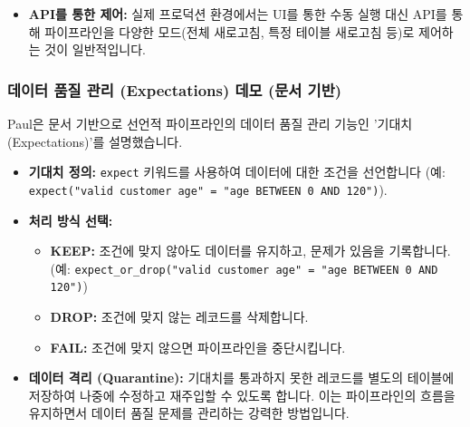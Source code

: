 \documentclass[11pt,a4paper]{article}
\begin{document}
\begin{enumerate}
\begin{itemize}
\begin{itemize}
        \item \textbf{선택적 테이블 새로고침:} 파이프라인 내의 특정 테이블만 선택하여 새로고침할 수 있습니다.
        \item \textbf{이벤트 로그 (Event Log):} 파이프라인의 모든 작업(시작, 리소스 대기, 초기화, 테이블 생성, 실행 등)이 기록되어 문제 발생 시 디버깅에 활용됩니다. 이 로그는 Delta 테이블에 저장되어 완전한 가시성을 제공합니다.
        \item \textbf{쿼리 기록 (Query History):} 엔진이 자동으로 생성하고 실행한 SQL 쿼리 및 실행 계획을 확인할 수 있습니다. 이를 통해 성능 분석 및 최적화에 필요한 정보를 얻을 수 있습니다.
    \end{itemize}
    \item \textbf{API를 통한 제어:} 실제 프로덕션 환경에서는 UI를 통한 수동 실행 대신 API를 통해 파이프라인을 다양한 모드(전체 새로고침, 특정 테이블 새로고침 등)로 제어하는 것이 일반적입니다.
\end{itemize}

\subsubsection{데이터 품질 관리 (Expectations) 데모 (문서 기반)}
Paul은 문서 기반으로 선언적 파이프라인의 데이터 품질 관리 기능인 '기대치(Expectations)'를 설명했습니다.

\begin{itemize}
    \item \textbf{기대치 정의:} \texttt{expect} 키워드를 사용하여 데이터에 대한 조건을 선언합니다 (예: \texttt{expect("valid customer age" = "age BETWEEN 0 AND 120")}).
    \item \textbf{처리 방식 선택:}
    \begin{itemize}
        \item \textbf{KEEP:} 조건에 맞지 않아도 데이터를 유지하고, 문제가 있음을 기록합니다. (예: \texttt{expect_or_drop("valid customer age" = "age BETWEEN 0 AND 120")})
        \item \textbf{DROP:} 조건에 맞지 않는 레코드를 삭제합니다.
        \item \textbf{FAIL:} 조건에 맞지 않으면 파이프라인을 중단시킵니다.
    \end{itemize}
    \item \textbf{데이터 격리 (Quarantine):} 기대치를 통과하지 못한 레코드를 별도의 테이블에 저장하여 나중에 수정하고 재주입할 수 있도록 합니다. 이는 파이프라인의 흐름을 유지하면서 데이터 품질 문제를 관리하는 강력한 방법입니다.
\end{itemize}


\end{enumerate}
\end{document}
